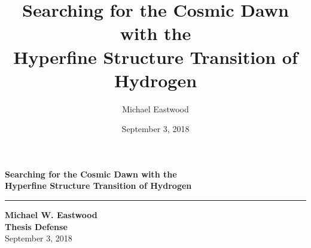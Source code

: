 \documentclass{beamer}
\begin{document}
\title[Searching for the Cosmic Dawn]{
    Searching for the Cosmic Dawn with the\\
    Hyperfine Structure Transition of Hydrogen
}
\author{Michael Eastwood}
\date{September 3, 2018} 

{
    \begin{frame}[t]
        \begin{center}
            \textbf{
                \Large
                Searching for the Cosmic Dawn with the\\
                \vskip4pt
                \large
                Hyperfine Structure Transition of Hydrogen
            } \\
            \vskip8pt
            \hrule
            \vskip8pt
            \textbf{Michael W. Eastwood} \\
            {\footnotesize \textbf{Thesis Defense}} \\
            {\footnotesize September 3, 2018} \\
        \end{center}
    \end{frame}
}
\end{document}
